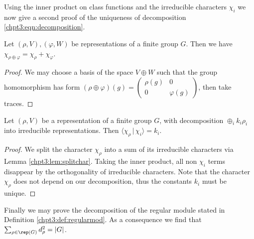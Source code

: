 \documentclass[11pt]{report}
\begin{document}
Using the inner product on class functions and the irreducible characters $\chi_{i}$ we now give a second proof of the uniqueness of decomposition \eqref{chpt3:eqn:decomposition}.

\begin{lemma}
	\label{chpt3:lem:splitchar}
	Let $(\rho,V),(\varphi,W)$ be representations of a finite group $G$. Then we have $\chi_{\rho \oplus \varphi} = \chi_{\rho} + \chi_{\varphi}$.
\end{lemma}

\begin{proof}
	We may choose a basis of the space $V\oplus W$ such that the group homomorphism  has form $(\rho \oplus \varphi) (g) = \left({\begin{array}{cc} \rho(g) & 0 \\	0 & \varphi(g)	\end{array}} \right)$, then take traces.
\end{proof}

\begin{corollary}
	Let $(\rho,V)$ be a representation of a finite group $G$, with decomposition $\oplus_{i} k_{i} \rho_{i}$ into irreducible representations. Then $\langle \chi_{\rho} \, | \, \chi_{i} \rangle = k_{i}$.
\end{corollary}
\begin{proof}
	We split the character $\chi_{\rho}$ into a sum of its irreducible characters via Lemma \ref{chpt3:lem:splitchar}. Taking the inner product, all non $\chi_{i}$ terms disappear by the orthogonality of irreducible characters. Note that the character $\chi_{\rho}$ does not depend on our decomposition, thus the constants $k_{i}$ must be unique.
\end{proof}

Finally we may prove the decomposition of the regular module stated in Definition \ref{chpt3:def:regularmod}. As a consequence we find that $\sum_{\rho \in \rep(G)} d_{\rho}^{2} = |G|$.
\end{document}
